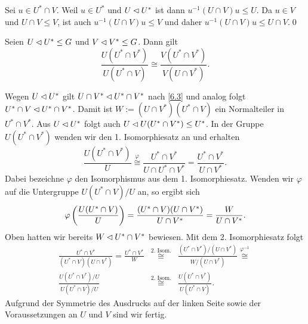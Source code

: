 \begin{beweis}
 Sei $u\in U^*\cap V$. Weil $u\in U^*$ und $U\lhd U^*$ ist dann $u^{-1}(U\cap V)u\leq U$. Da $u\in V$ und $U\cap V\leq V$, ist auch $u^{-1}(U\cap V)u\leq V$ und daher $u^{-1}(U\cap V)u\leq U\cap V$.\qed
\end{beweis}
\begin{lemma}[Zassenhaus] \label{6.4}
 Seien $U\lhd U^*\leq G$ und $V\lhd V^*\leq G$. Dann gilt
$$\frac{U(U^*\cap V^*)}{U(U^*\cap V)}\cong \frac{V(U^*\cap V^*)}{V(U\cap V^*)}.$$
\end{lemma}
\begin{beweis}
 Wegen $U\lhd U^*$ gilt $U\cap V^* \lhd U^*\cap V^*$ nach \ref{6.3} und analog folgt $U^*\cap V \lhd U^*\cap V^*$. Damit ist $W:=(U\cap V^*)(U^*\cap V)$ ein Normalteiler in $U^*\cap V^*$. Aus $U\lhd U^*$ folgt auch $U\lhd U(U^*\cap V^*)\leq U^*$. In der Gruppe $U(U^*\cap V^*)$ wenden wir den 1. Isomorphiesatz an und erhalten $$\frac{U(U^*\cap V^*)}{U}\stackrel{\varphi}{\cong}\frac{U^*\cap V^*}{U\cap U^*\cap V^*}=\frac{U^*\cap V^*}{U\cap V^*}.$$
Dabei bezeichne $\varphi$ den Isomorphismus aus dem 1. Isomorphiesatz. Wenden wir $\varphi$ auf die Untergruppe $U(U^*\cap V)/U$ an, so ergibt sich $$\varphi\left(\frac{U(U^*\cap V)}{U}\right)=\frac{(U^*\cap V)(U\cap V^*)}{U\cap V^*}=\frac{W}{U\cap V^*}.$$
Oben hatten wir bereits $W\lhd U^*\cap V^*$ bewiesen. Mit dem 2. Isomorphiesatz folgt
\begin{eqnarray*}
 \frac{U^*\cap V^*}{(U^*\cap V)(U\cap V^*)}=\frac{U^*\cap V^*}{W}&\stackrel{\text{2. Isom.}}{\cong}&\frac{(U^*\cap V^*)/(U\cap V^*)}{W/(U\cap V^*)}\stackrel{\varphi^{-1}}{\cong}\\\frac{U(U^*\cap V^*)/U}{U(U^*\cap V)/U}&\stackrel{\text{2. Isom.}}{\cong}&\frac{U(U^*\cap V^*)}{U(U^*\cap V)}.
\end{eqnarray*}
Aufgrund der Symmetrie des Ausdrucks auf der linken Seite sowie der Voraussetzungen an $U$ und $V$ sind wir fertig.
\end{beweis}


